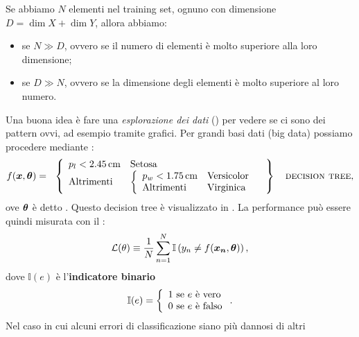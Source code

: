 \documentclass[10pt]{article}
\begin{document}
\begin{example}
Se abbiamo \( N \) elementi nel training set, ognuno con dimensione \( D = \dim{X} +
\dim{Y} \), allora abbiamo:
\begin{itemize}
\item {} se \( N\gg D \), ovvero se il numero di elementi è molto superiore alla loro dimensione;
\item {} se \( D\gg N \), ovvero se la dimensione degli elementi è molto superiore al loro numero.
\end{itemize}

Una buona idea è fare una \textit{esplorazione dei dati} () per vedere se ci sono dei pattern ovvi, ad esempio tramite grafici.
Per grandi basi dati (big data) possiamo procedere mediante :
\begin{equation}
f(\bm{x}, \bm{\theta}) = \left.\begin{array}{l}
\left\{\begin{array}{ll}
p_l < \qty{2.45}{cm} & \text{Setosa} \\
\text{Altrimenti} & \left\{\begin{array}{ll}
p_w < \qty{1.75}{cm} & \text{Versicolor} \\
\text{Altrimenti} & \text{Virginica} \\
\end{array}\right.
\end{array}\right.
\end{array}\right\} \quad\text{\textsc{decision tree}},
\end{equation}
ove $\bm{\theta}$ è detto . Questo decision tree è
visualizzato in . La performance può essere quindi
misurata con il :
\begin{equation}\label{eq:misclassification-rate-simple}
\mathcal{L}(\theta) \equiv \frac{1}{N}\sum_{n=1}^N \mathbb{I}\left( y_n \neq f(\bm{x_n}, \bm{\theta}) \right),
\end{equation}
dove $\mathbb{I}(e)$ è l'\textbf{indicatore binario}
\begin{equation}\label{eq:indicatore-binario}
\mathbb{I}(e) = \left\{\begin{array}{l@{\text{ se } e \text{ è }}l}
1 & \text{vero} \\
0 & \text{falso} \\
\end{array}\right..
\end{equation}
Nel caso in cui alcuni errori di classificazione siano più dannosi di altri

\end{example}
\end{document}
